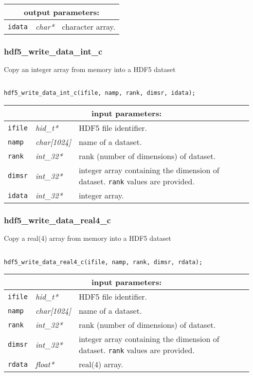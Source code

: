 \vskip 0.8cm

\noindent
\begin{tabular}{|p{1.5cm}|p{2cm}|p{11cm}|}
\hline
\multicolumn{3}{|c|}{\bf output parameters:} \\
\hline
{\tt idata} & {\it char*} & character array. \\
\hline
\end{tabular}

\subsubsection{hdf5\_write\_data\_int\_c}

Copy an integer array from memory into a HDF5 dataset

\begin{verbatim}

hdf5_write_data_int_c(ifile, namp, rank, dimsr, idata);
\end{verbatim}

\noindent
\begin{tabular}{|p{1.5cm}|p{2cm}|p{11cm}|}
\hline
\multicolumn{3}{|c|}{\bf input parameters:} \\
\hline
{\tt ifile} & {\it hid\_t*} & HDF5 file identifier. \\
\hline
{\tt namp} & {\it char[1024]} & name of a dataset. \\
\hline
{\tt rank} & {\it int\_32*} & rank (number of dimensions) of dataset. \\
\hline
{\tt dimsr} & {\it int\_32*} & integer array containing the dimension of dataset. {\tt rank} values are provided. \\
\hline
{\tt idata} & {\it int\_32*} & integer array. \\
\hline
\end{tabular}

\subsubsection{hdf5\_write\_data\_real4\_c}

Copy a real(4) array from memory into a HDF5 dataset

\begin{verbatim}

hdf5_write_data_real4_c(ifile, namp, rank, dimsr, rdata);
\end{verbatim}

\noindent
\begin{tabular}{|p{1.5cm}|p{2cm}|p{11cm}|}
\hline
\multicolumn{3}{|c|}{\bf input parameters:} \\
\hline
{\tt ifile} & {\it hid\_t*} & HDF5 file identifier. \\
\hline
{\tt namp} & {\it char[1024]} & name of a dataset. \\
\hline
{\tt rank} & {\it int\_32*} & rank (number of dimensions) of dataset. \\
\hline
{\tt dimsr} & {\it int\_32*} & integer array containing the dimension of dataset. {\tt rank} values are provided. \\
\hline
{\tt rdata} & {\it float*} & real(4) array. \\
\hline
\end{tabular}

